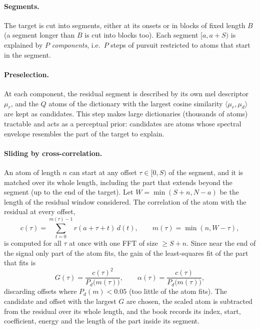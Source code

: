 \documentclass[11pt,a4paper]{article}
\newcommand{\inner}[2]{\langle #1, #2 \rangle}
\begin{document}
\paragraph{Segments.} The target is cut into segments, either at its onsets
or in blocks of fixed length $B$ (a segment longer than $B$ is cut into
blocks too). Each segment $[a, a+S)$ is explained by $P$ \emph{components},
i.e.\ $P$ steps of pursuit restricted to atoms that start in the segment.

\paragraph{Preselection.} At each component, the residual segment is
described by its own mel descriptor $\mu_r$, and the $Q$ atoms of the
dictionary with the largest cosine similarity $\inner{\mu_r}{\mu_d}$ are kept
as candidates. This step makes large dictionaries (thousands of atoms)
tractable and acts as a perceptual prior: candidates are atoms whose spectral
envelope resembles the part of the target to explain.

\paragraph{Sliding by cross-correlation.} An atom of length $n$ can start at
any offset $\tau \in [0, S)$ of the segment, and it is matched over its whole
length, including the part that extends beyond the segment (up to the end of
the target). Let $W = \min(S + n, N - a)$ be the length of the residual
window considered. The correlation of the atom with the residual at every
offset,
\begin{equation}
  c(\tau) = \sum_{t=0}^{m(\tau) - 1} r(a + \tau + t)\, d(t), \qquad
  m(\tau) = \min(n, W - \tau),
\end{equation}
is computed for all $\tau$ at once with one FFT of size $\ge S + n$. Since
near the end of the signal only part of the atom fits, the gain of the
least-squares fit of the part that fits is
\begin{equation}
  G(\tau) = \frac{c(\tau)^2}{P_d\bigl(m(\tau)\bigr)}, \qquad
  \alpha(\tau) = \frac{c(\tau)}{P_d\bigl(m(\tau)\bigr)},
\end{equation}
discarding offsets where $P_d(m) < 0.05$ (too little of the atom fits). The
candidate and offset with the largest $G$ are chosen, the scaled atom is
subtracted from the residual over its whole length, and the book records its
index, start, coefficient, energy and the length of the part inside its
segment.
\end{document}
